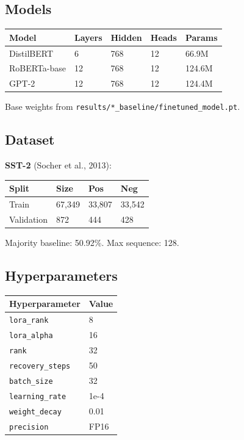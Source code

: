 \subsection{Models}

\begin{table}[H]
\centering
\small
\begin{tabular}{lllll}
\toprule
\textbf{Model} & \textbf{Layers} & \textbf{Hidden} & \textbf{Heads} & \textbf{Params} \\
\midrule
DistilBERT & 6 & 768 & 12 & 66.9M \\
RoBERTa-base & 12 & 768 & 12 & 124.6M \\
GPT-2 & 12 & 768 & 12 & 124.4M \\
\bottomrule
\end{tabular}
\end{table}

Base weights from \texttt{results/*\_baseline/finetuned\_model.pt}.

\subsection{Dataset}

\textbf{SST-2} (Socher et al., 2013):

\begin{table}[H]
\centering
\small
\begin{tabular}{llll}
\toprule
\textbf{Split} & \textbf{Size} & \textbf{Pos} & \textbf{Neg} \\
\midrule
Train & 67,349 & 33,807 & 33,542 \\
Validation & 872 & 444 & 428 \\
\bottomrule
\end{tabular}
\end{table}

Majority baseline: 50.92\%. Max sequence: 128.

\subsection{Hyperparameters}

\begin{table}[H]
\centering
\small
\begin{tabular}{ll}
\toprule
\textbf{Hyperparameter} & \textbf{Value} \\
\midrule
\texttt{lora\_rank} & 8 \\
\texttt{lora\_alpha} & 16 \\
\texttt{rank} & 32 \\
\texttt{recovery\_steps} & 50 \\
\texttt{batch\_size} & 32 \\
\texttt{learning\_rate} & 1e-4 \\
\texttt{weight\_decay} & 0.01 \\
\texttt{precision} & FP16 \\
\bottomrule
\end{tabular}
\end{table}

